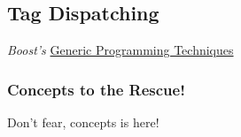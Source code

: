 \subsection{Tag Dispatching} \label{sec:tag_dispatching}

    \emph{Boost's} \href{https://www.boost.org/community/generic_programming.html#tag_dispatching}{Generic Programming Techniques}

    

    

    \subsubsection*{Concepts to the Rescue!}

    Don't fear, concepts is here!

    
